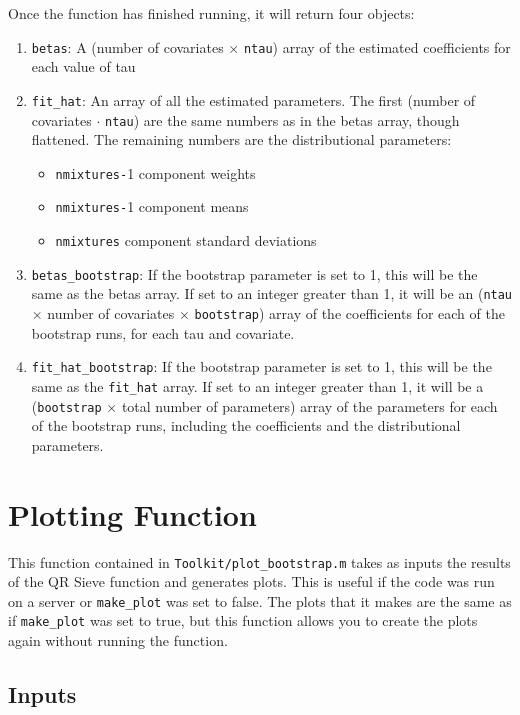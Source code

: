\documentclass[12pt]{article}
\begin{document}
Once the function has finished running, it will return four objects:

\begin{enumerate}
    \item \lstinline{betas}: A (number of covariates $\times$ \lstinline{ntau}) array of the estimated coefficients for each value of tau
    \item \lstinline{fit_hat}: An array of all the estimated parameters. The first (number of covariates $\cdot$ \lstinline{ntau}) are the same numbers as in the betas array, though flattened. The remaining numbers are the distributional parameters:
    \begin{itemize}
        \item \lstinline{nmixtures-}1 component weights
        \item \lstinline{nmixtures-}1 component means
        \item \lstinline{nmixtures} component standard deviations
    \end{itemize}
    \item \lstinline{betas_bootstrap}: If the bootstrap parameter is set to 1, this will be the same as the betas array. If set to an integer greater than 1, it will be an (\lstinline{ntau} $\times$ number of covariates $\times$ \lstinline{bootstrap}) array of the coefficients for each of the bootstrap runs, for each tau and covariate.
    \item \lstinline{fit_hat_bootstrap}: If the bootstrap parameter is set to 1, this will be the same as the \lstinline{fit_hat} array. If set to an integer greater than 1, it will be a (\lstinline{bootstrap} $\times$ total number of parameters) array of the parameters for each of the bootstrap runs, including the coefficients and the distributional parameters.
\end{enumerate}

\section{Plotting Function}

This function contained in \lstinline{Toolkit/plot_bootstrap.m} takes as inputs the results of the QR Sieve function and generates plots. This is useful if the code was run on a server or \lstinline{make_plot} was set to false. The plots that it makes are the same as if \lstinline{make_plot} was set to true, but this function allows you to create the plots again without running the function.

\subsection{Inputs}
\end{document}
